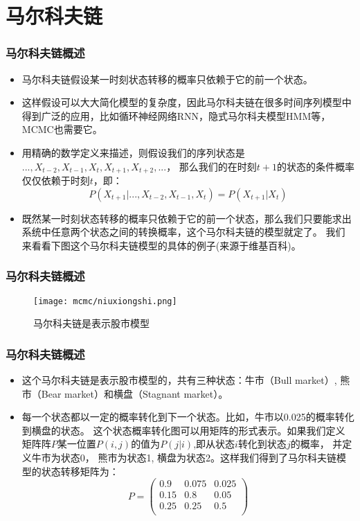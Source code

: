 \section{马尔科夫链}

\begin{frame}
  \frametitle{马尔科夫链概述}
  \begin{itemize}
    \item 马尔科夫链假设某一时刻状态转移的概率只依赖于它的前一个状态。
    \item 这样假设可以大大简化模型的复杂度，因此马尔科夫链在很多时间序列模型中得到广泛的应用，比如循环神经网络RNN，隐式马尔科夫模型HMM等，MCMC也需要它。
    \item 用精确的数学定义来描述，则假设我们的序列状态是$..., X_{t-2}, X_{t-1}, X_t, X_{t+1}, X_{t+2},...$，
    那么我们的在时刻$t+1$的状态的条件概率仅仅依赖于时刻$t$，即：
    $$P(X_{t+1}|...,X_{t-2},X_{t-1},X_t) = P(X_{t+1}|X_t)$$
    \item 既然某一时刻状态转移的概率只依赖于它的前一个状态，那么我们只要能求出系统中任意两个状态之间的转换概率，这个马尔科夫链的模型就定了。
    我们来看看下图这个马尔科夫链模型的具体的例子(来源于维基百科)。
  \end{itemize}
\end{frame}

\begin{frame}
  \frametitle{马尔科夫链概述}
  \begin{figure}
    \texttt{[image: mcmc/niuxiongshi.png]}
    \caption{马尔科夫链是表示股市模型}
  \end{figure}
\end{frame}

\begin{frame}
  \frametitle{马尔科夫链概述}
  \begin{itemize}
    \item 这个马尔科夫链是表示股市模型的，共有三种状态：牛市（Bull market）, 熊市（Bear market）和横盘（Stagnant market）。
    \item 每一个状态都以一定的概率转化到下一个状态。比如，牛市以0.025的概率转化到横盘的状态。
    这个状态概率转化图可以用矩阵的形式表示。如果我们定义矩阵阵$P$某一位置$P(i,j)$的值为$P(j|i)$,即从状态$i$转化到状态$j$的概率，
    并定义牛市为状态0， 熊市为状态1, 横盘为状态2。这样我们得到了马尔科夫链模型的状态转移矩阵为：
    \begin{equation*}
      P = 
      \begin{pmatrix}
        0.9 & 0.075 & 0.025 \\
        0.15 & 0.8 & 0.05  \\
        0.25 & 0.25 & 0.5 \\
      \end{pmatrix}
    \end{equation*}
  \end{itemize}
\end{frame}

